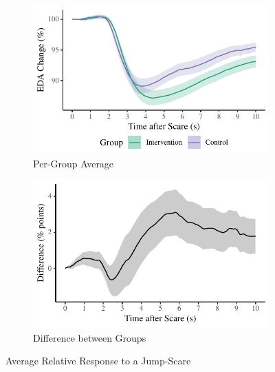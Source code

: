 \documentclass[12pt,a4paper]{article}\usepackage[]{graphicx}\usepackage[]{color}
\makeatletter
\def\maxwidth{ %
  \ifdim\Gin@nat@width>\linewidth
    \linewidth
  \else
    \Gin@nat@width
  \fi
}
\makeatother
\begin{document}
\begin{figure}
	\centering
	\begin{subfigure}[t]{.49\linewidth}


{\centering \includegraphics[width=\maxwidth]{figure/ResponseAfterScareRel-1} 

}



		\caption{Per-Group Average}
	\end{subfigure}
	\begin{subfigure}[t]{.49\linewidth}


{\centering \includegraphics[width=\maxwidth]{figure/CompareGroupsRel-1} 

}



		\caption{Difference between Groups}
	\end{subfigure}
	\caption{Average Relative Response to a Jump-Scare}
	\label{fig:ResponseAfterScareRel}
\end{figure}
\end{document}

